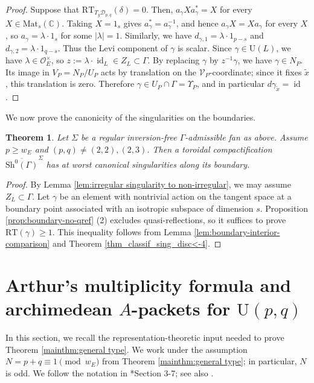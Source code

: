 \documentclass[11pt]{amsart}
\theoremstyle{plain}
\newtheorem{thm}{Theorem}[section]
\theoremstyle{definition}
\numberwithin{equation}{section}
\def\id{\mathop{\mathrm{id}}\nolimits}
\def\OO{\mathscr{O}}
\def\U{\mathrm{U}}
\newcommand{\bbC}{\mathbb{C}}
\newcommand{\calD}{\mathcal{D}}
\newcommand{\Mat}{\mathrm{Mat}}
\begin{document}
\begin{proof}
Suppose that $\mathrm{RT}_{T_y\calD_{p,q}}(\delta) = 0$.
Then, $a_\gamma Xa_\gamma^*=X$ for every $X\in\Mat_s(\bbC)$. 
Taking
$X=1_s$ gives $a_\gamma^*=a_\gamma^{-1}$, and hence
$a_\gamma X=Xa_\gamma$ for every $X$, so
$a_\gamma=\lambda \cdot 1_s$ for some $|\lambda|=1$.
Similarly, we have
$d_{\gamma,1}=\lambda \cdot 1_{p-s}$ and
$d_{\gamma,2}=\lambda \cdot 1_{q-s}$.
Thus the Levi component of $\gamma$ is scalar.
Since $\gamma\in\U(L)$, we have $\lambda\in\OO_E^\times$, so $z:=\lambda \cdot \id_L\in Z_L\subset\Gamma$. 
By replacing $\gamma$ by $z^{-1}\gamma$, we have $\gamma\in N_P$. 
Its image in $V_P=N_P/U_P$ acts by translation on
the $\mathcal V_P$-coordinate; since it fixes $\widetilde{x}$, this translation is zero. Therefore $\gamma\in U_P\cap\Gamma=\Upsilon_P$, and in particular $d\gamma_{\widetilde{x}}=\id$.
\end{proof}


We now prove the canonicity of the singularities on the boundaries.

\begin{thm}\label{thm:nonterminal}
Let $\Sigma$ be a regular inversion-free $\Gamma$-admissible fan as above.
Assume $p\geq w_E$ and $(p,q)\neq(2,2), (2,3)$.
Then a toroidal compactification $\overline{\mathrm{Sh}^0(\Gamma)}^{\Sigma}$ has at worst canonical singularities along its boundary.
\end{thm}
\begin{proof}
By Lemma \ref{lem:irregular singularity to non-irregular},
we may assume $Z_L\subset\Gamma$.
Let $\gamma$ be an element with nontrivial action on the tangent space at a boundary point associated with an isotropic subspace of dimension $s$.
Proposition \ref{prop:boundary-no-qref} (2) excludes
quasi-reflections, so it suffices to prove
$\mathrm{RT}(\gamma)\geq1$.
This inequality follows from Lemma \ref{lem:boundary-interior-comparison} and Theorem \ref{thm_classif_sing_disc<-4}.
\end{proof}




















\section{Arthur's multiplicity formula and archimedean \texorpdfstring{$A$}{}-packets for \texorpdfstring{$\U(p,q)$}{}}
\label{sec:Archimedean packets in the present case}
In this section, we recall the representation-theoretic input needed to prove Theorem \ref{mainthm:general type}.
We work under the assumption $N=p+q\equiv 1 \pmod{w_E}$ from Theorem \ref{mainthm:general type}; in particular, $N$ is odd.
We follow the notation in \cite{2025_HMY_Kodaira_dimension_ball_quotients}*{Section 3-7}; see also \cite{KMSW}.
\end{document}

